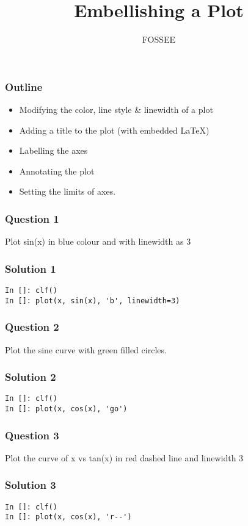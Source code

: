 \documentclass[presentation]{beamer}
\title{Embellishing a Plot}
\author{FOSSEE}
\date{}
\begin{document}
\maketitle









\begin{frame}
\frametitle{Outline}
\label{sec-1}

\begin{itemize}
\item Modifying the color, line style \& linewidth of a plot
\item Adding a title to the plot (with embedded \LaTeX{})
\item Labelling the axes
\item Annotating the plot
\item Setting the limits of axes.
\end{itemize}
\end{frame}
\begin{frame}
\frametitle{Question 1}
\label{sec-2}

  Plot sin(x) in blue colour and with linewidth as 3
\end{frame}
\begin{frame}[fragile]
\frametitle{Solution 1}
\label{sec-3}

\begin{verbatim}
In []: clf()
In []: plot(x, sin(x), 'b', linewidth=3)
\end{verbatim}
\end{frame}
\begin{frame}
\frametitle{Question 2}
\label{sec-4}

  Plot the sine curve with green filled circles.
\end{frame}
\begin{frame}[fragile]
\frametitle{Solution 2}
\label{sec-5}

\begin{verbatim}
In []: clf()
In []: plot(x, cos(x), 'go')
\end{verbatim}
\end{frame}
\begin{frame}
\frametitle{Question 3}
\label{sec-6}

  Plot the curve of x vs tan(x) in red dashed line and linewidth 3
\end{frame}
\begin{frame}[fragile]
\frametitle{Solution 3}
\label{sec-7}

\begin{verbatim}
In []: clf()
In []: plot(x, cos(x), 'r--')
\end{verbatim}
\end{frame}
\end{document}

